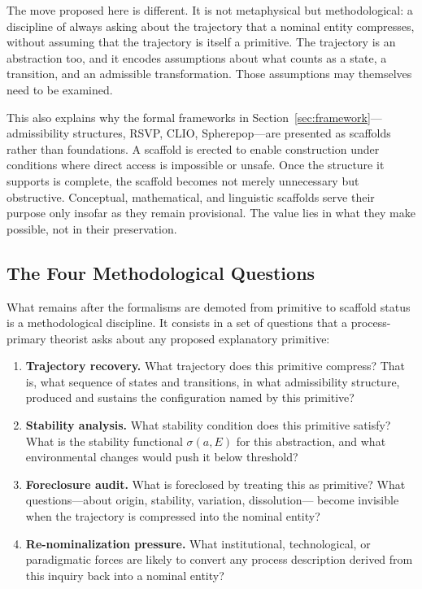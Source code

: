 \documentclass[12pt, a4paper]{article}
\theoremstyle{plain}
\theoremstyle{definition}
\theoremstyle{remark}
\begin{document}
The move proposed here is different. It is not metaphysical but methodological:
a discipline of always asking about the trajectory that a nominal entity
compresses, without assuming that the trajectory is itself a primitive.
The trajectory is an abstraction too, and it encodes assumptions about what
counts as a state, a transition, and an admissible transformation. Those
assumptions may themselves need to be examined.

This also explains why the formal frameworks in Section~\ref{sec:framework}---
admissibility structures, RSVP, CLIO, Spherepop---are presented as scaffolds
rather than foundations. A scaffold is erected to enable construction under
conditions where direct access is impossible or unsafe. Once the structure
it supports is complete, the scaffold becomes not merely unnecessary but
obstructive. Conceptual, mathematical, and linguistic scaffolds serve their
purpose only insofar as they remain provisional. The value lies in what they
make possible, not in their preservation.

\subsection{The Four Methodological Questions}

What remains after the formalisms are demoted from primitive to scaffold
status is a methodological discipline. It consists in a set of questions
that a process-primary theorist asks about any proposed explanatory primitive:

\begin{enumerate}[leftmargin=*, label=(\roman*)]
\item \textbf{Trajectory recovery.} What trajectory does this primitive compress?
That is, what sequence of states and transitions, in what admissibility
structure, produced and sustains the configuration named by this primitive?

\item \textbf{Stability analysis.} What stability condition does this primitive
satisfy? What is the stability functional $\sigma(a, E)$ for this abstraction,
and what environmental changes would push it below threshold?

\item \textbf{Foreclosure audit.} What is foreclosed by treating this as
primitive? What questions---about origin, stability, variation, dissolution---
become invisible when the trajectory is compressed into the nominal entity?

\item \textbf{Re-nominalization pressure.} What institutional, technological,
or paradigmatic forces are likely to convert any process description derived
from this inquiry back into a nominal entity?
\end{enumerate}
\end{document}
